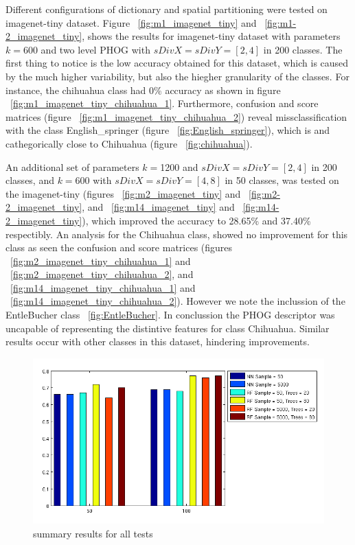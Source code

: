 \documentclass[10pt,two column,letter paper]{article}
\begin{document}
Different configurations of dictionary and spatial partitioning were tested on imagenet-tiny dataset. Figure ~\ref{fig:m1_imagenet_tiny} and ~\ref{fig:m1-2_imagenet_tiny},
shows the results for imagenet-tiny dataset with parameters $k=$600 and two level PHOG with $sDivX=sDivY=[2,4]$ in 200 classes. The first thing to notice is the low
accuracy obtained for this dataset, which is caused by the much higher variability, but also the hiegher granularity of the classes. For instance, the 
chihuahua class had 0\% accuracy as shown in figure ~\ref{fig:m1_imagenet_tiny_chihuahua_1}. Furthermore, confusion and score matrices 
(figure ~\ref{fig:m1_imagenet_tiny_chihuahua_2}) reveal missclassification with the class English\_springer (figure ~\ref{fig:English_springer}), which is
and cathegorically close to Chihuahua (figure ~\ref{fig:chihuahua}). 

An additional set of parameters $k=$1200 and $sDivX=sDivY=[2, 4]$ in 200 classes, and $k=$600 with $sDivX=sDivY=[4, 8]$ in 50 classes, 
was tested on the imagenet-tiny (figures ~\ref{fig:m2_imagenet_tiny} and ~\ref{fig:m2-2_imagenet_tiny}, and ~\ref{fig:m14_imagenet_tiny} and ~\ref{fig:m14-2_imagenet_tiny}),
which improved the accuracy to 28.65\% and 37.40\% respectibly. An analysis for the Chihuahua class, showed no improvement for this class as seen the confusion and score matrices 
(figures ~\ref{fig:m2_imagenet_tiny_chihuahua_1} and ~\ref{fig:m2_imagenet_tiny_chihuahua_2}, and ~\ref{fig:m14_imagenet_tiny_chihuahua_1} and ~\ref{fig:m14_imagenet_tiny_chihuahua_2}).
However we note the inclussion of the EntleBucher class ~\ref{fig:EntleBucher}. In conclussion the PHOG descriptor was uncapable of representing the distintive features for class Chihuahua.
Similar results occur with other classes in this dataset, hindering improvements.



\begin{figure}[t]
\begin{center}
\includegraphics[width=0.9\linewidth]{bar_all.png}
\end{center}
   \caption{summary results for all tests}
\label{fig:bar_all}
\end{figure}
\end{document}
